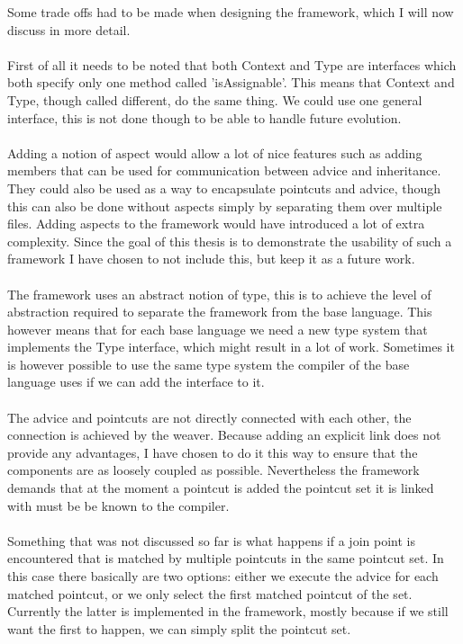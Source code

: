 \documentclass[a4paper]{report}
\begin{document}
Some trade offs had to be made when designing the framework, which I will now discuss in more detail.\\
\\
First of all it needs to be noted that both Context and Type are interfaces which both specify only one method called 'isAssignable'. This means that Context and Type, though called different, do the same thing. We could use one general interface, this is not done though to be able to handle future evolution.\\
\\
Adding a notion of aspect would allow a lot of nice features such as adding members that can be used for communication between advice and inheritance. They could also be used as a way to encapsulate pointcuts and advice, though this can also be done without aspects simply by separating them over multiple files. Adding aspects to the framework would have introduced a lot of extra complexity. Since the goal of this thesis is to demonstrate the usability of such a framework I have chosen to not include this, but keep it as a future work.\\
\\
The framework uses an abstract notion of type, this is to achieve the level of abstraction required to separate the framework from the base language. This however means that for each base language we need a new type system that implements the Type interface, which might result in a lot of work. Sometimes it is however possible to use the same type system the compiler of the base language uses if we can add the interface to it.\\
\\
The advice and pointcuts are not directly connected with each other, the connection is achieved by the weaver. Because adding an explicit link does not provide any advantages, I have chosen to do it this way to ensure that the components are as loosely coupled as possible. Nevertheless the framework demands that at the moment a pointcut is added the pointcut set it is linked with must be be known to the compiler.\\
\\
Something that was not discussed so far is what happens if a join point is encountered that is matched by multiple pointcuts in the same pointcut set. In this case there basically are two options: either we execute the advice for each matched pointcut, or we only select the first matched pointcut of the set. Currently the latter is implemented in the framework, mostly because if we still want the first to happen, we can simply split the pointcut set.\\
\end{document}
